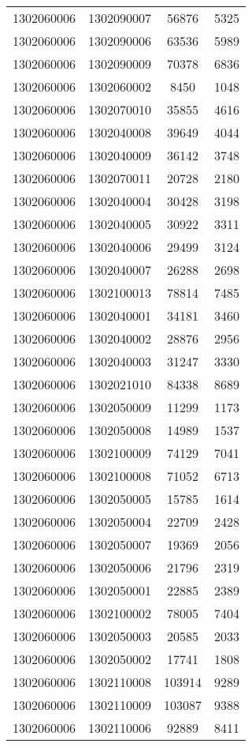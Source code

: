 \begin{longtable}[h]{llcc}
		1302060006 & 1302090007 & 56876 & 5325\\
		1302060006 & 1302090006 & 63536 & 5989\\
		1302060006 & 1302090009 & 70378 & 6836\\
		1302060006 & 1302060002 & 8450 & 1048\\
		1302060006 & 1302070010 & 35855 & 4616\\
		1302060006 & 1302040008 & 39649 & 4044\\
		1302060006 & 1302040009 & 36142 & 3748\\
		1302060006 & 1302070011 & 20728 & 2180\\
		1302060006 & 1302040004 & 30428 & 3198\\
		1302060006 & 1302040005 & 30922 & 3311\\
		1302060006 & 1302040006 & 29499 & 3124\\
		1302060006 & 1302040007 & 26288 & 2698\\
		1302060006 & 1302100013 & 78814 & 7485\\
		1302060006 & 1302040001 & 34181 & 3460\\
		1302060006 & 1302040002 & 28876 & 2956\\
		1302060006 & 1302040003 & 31247 & 3330\\
		1302060006 & 1302021010 & 84338 & 8689\\
		1302060006 & 1302050009 & 11299 & 1173\\
		1302060006 & 1302050008 & 14989 & 1537\\
		1302060006 & 1302100009 & 74129 & 7041\\
		1302060006 & 1302100008 & 71052 & 6713\\
		1302060006 & 1302050005 & 15785 & 1614\\
		1302060006 & 1302050004 & 22709 & 2428\\
		1302060006 & 1302050007 & 19369 & 2056\\
		1302060006 & 1302050006 & 21796 & 2319\\
		1302060006 & 1302050001 & 22885 & 2389\\
		1302060006 & 1302100002 & 78005 & 7404\\
		1302060006 & 1302050003 & 20585 & 2033\\
		1302060006 & 1302050002 & 17741 & 1808\\
		1302060006 & 1302110008 & 103914 & 9289\\
		1302060006 & 1302110009 & 103087 & 9388\\
		1302060006 & 1302110006 & 92889 & 8411\\

\end{longtable}
